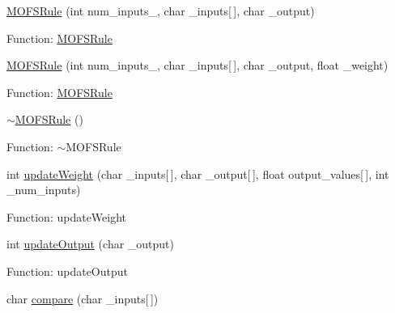 \begin{DoxyCompactItemize}
\item 
\hyperlink{classMOFSRule_a6aceb592fa68259a2476dfca7a9aaf93}{M\-O\-F\-S\-Rule} (int num\-\_\-inputs\-\_\-, char \-\_\-inputs\mbox{[}$\,$\mbox{]}, char \-\_\-output)
\begin{DoxyCompactList}\small\item\em 

 Function\-: \hyperlink{classMOFSRule}{M\-O\-F\-S\-Rule} \end{DoxyCompactList}\item 
\hyperlink{classMOFSRule_a366c0fd907c49a81733ff9a56334e904}{M\-O\-F\-S\-Rule} (int num\-\_\-inputs\-\_\-, char \-\_\-inputs\mbox{[}$\,$\mbox{]}, char \-\_\-output, float \-\_\-weight)
\begin{DoxyCompactList}\small\item\em 

 Function\-: \hyperlink{classMOFSRule}{M\-O\-F\-S\-Rule} \end{DoxyCompactList}\item 
\hyperlink{classMOFSRule_afee4ec6ac864908448ee88b301698cdf}{$\sim$\-M\-O\-F\-S\-Rule} ()
\begin{DoxyCompactList}\small\item\em 

 Function\-: $\sim$\-M\-O\-F\-S\-Rule \end{DoxyCompactList}\item 
int \hyperlink{classMOFSRule_a6f0a3d9a8f547a10a71be2216745caed}{update\-Weight} (char \-\_\-inputs\mbox{[}$\,$\mbox{]}, char \-\_\-output\mbox{[}$\,$\mbox{]}, float output\-\_\-values\mbox{[}$\,$\mbox{]}, int \-\_\-num\-\_\-inputs)
\begin{DoxyCompactList}\small\item\em 

 Function\-: update\-Weight \end{DoxyCompactList}\item 
int \hyperlink{classMOFSRule_aee0456aac6757ccfdcebba4371781dc6}{update\-Output} (char \-\_\-output)
\begin{DoxyCompactList}\small\item\em 

 Function\-: update\-Output \end{DoxyCompactList}\item 
char \hyperlink{classMOFSRule_a056f33ef6d993314febceeba1925bfdb}{compare} (char \-\_\-inputs\mbox{[}$\,$\mbox{]})
\begin{DoxyCompactList}\small\item\em 


\end{DoxyCompactList}
\end{DoxyCompactItemize}
